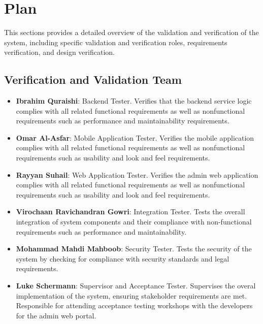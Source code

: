 \documentclass[12pt, titlepage]{article}
\begin{document}
\section{Plan}

This sections provides a detailed overview of the validation and verification of the system, including specific validation and verification roles, requirements verification, and design verification.

\subsection{Verification and Validation Team}

\begin{itemize}
  \item \textbf{Ibrahim Quraishi}: Backend Tester. Verifies that the backend service logic complies with all related functional requirements as well as nonfunctional requirements such as performance and maintainability requirements.
  \item \textbf{Omar Al-Asfar}: Mobile Application Tester. Verifies the mobile application complies with all related functional requirements as well as nonfunctional requirements such as usability and look and feel requirements.
  \item \textbf{Rayyan Suhail}: Web Application Tester. Verifies the admin web application complies with all related functional requirements as well as nonfunctional requirements such as usability and look and feel requirements.
  \item \textbf{Virochaan Ravichandran Gowri}: Integration Tester. Tests the overall integration of system components and their compliance with non-functional requirements such as performance and maintainability.
  \item \textbf{Mohammad Mahdi Mahboob}: Security Tester. Tests the security of the system by checking for compliance with security standards and legal requirements.
  \item \textbf{Luke Schermann}: Supervisor and Acceptance Tester. Supervises the overal implementation of the system, ensuring stakeholder requirements are met. Responsible for attending acceptance testing workshops with the developers for the admin web portal.
\end{itemize}
\end{document}
